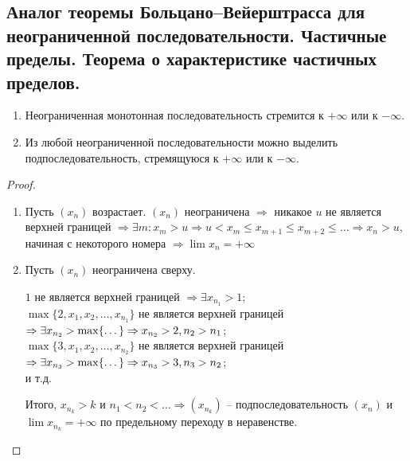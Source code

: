 \subsection{Аналог теоремы Больцано–Вейерштрасса для неограниченной 
    последовательности. Частичные пределы. Теорема о характеристике 
    частичных пределов.}
    
    \begin{theorem-non}\end{theorem-non}
    \begin{enumerate}
        \item Неограниченная монотонная последовательность стремится
        к $+\infty$ или к $-\infty$.
        \item Из любой неограниченной последовательности можно выделить
        подпоследовательность, стремящуюся к $+\infty$ или к $-\infty$.
    \end{enumerate}
    \begin{proof} $ $

    \begin{enumerate}
        \item Пусть $(x_n)$ возрастает. $(x_n)$ неограничена $\Rightarrow$
        никакое $u$ не является верхней границей $\Rightarrow \exists m :
        x_m > u \Rightarrow u < x_m \leqslant x_{m + 1} \leqslant x_{m + 2} \leqslant \dots
        \Rightarrow x_n > u$, начиная с некоторого номера $\Rightarrow
        \lim x_n = +\infty$
    
        \item Пусть $(x_n)$ неограничена сверху.
        
        $1$ не является верхней границей $\Rightarrow \exists x_{n_1} > 1$;\\
        $\max\{2, x_1, x_2, \dots, x_{n_1}\}$ не является верхней границей
        $\Rightarrow \exists x_{n_2} > \max\{\dots\} \Rightarrow x_{n_2} > 2,\\
        n_2 > n_1$;\\
        $\max\{3, x_1, x_2, \dots, x_{n_2}\}$ не является верхней границей
        $\Rightarrow \exists x_{n_3} > \max\{\dots\} \Rightarrow x_{n_3} > 3,\\
        n_3 > n_2$;\\
        и т.д.
    
        Итого, $x_{n_k} > k$ и $n_1 < n_2 < \dots \Rightarrow (x_{n_k})$
        -- подпоследовательность $(x_n)$ и $\lim x_{n_k} = +\infty$ по
        предельному переходу в неравенстве.
    \end{enumerate}
    \end{proof}
    

